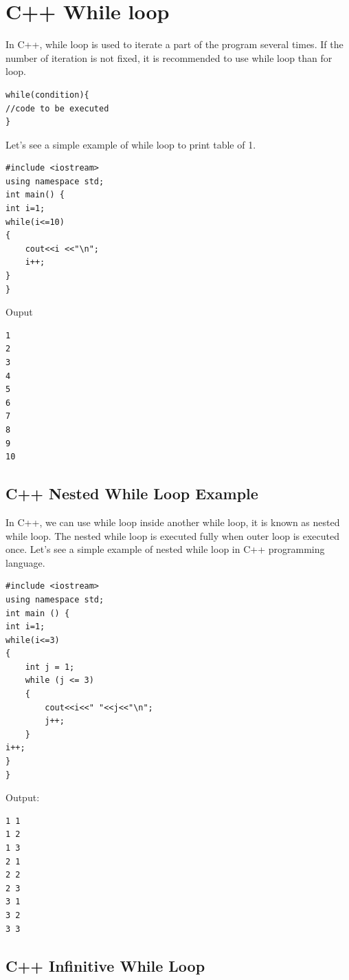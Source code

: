 \documentclass{book}
\begin{document}
\section{C++ While loop}

In C++, while loop is used to iterate a part of the program several times. If the number of iteration is not fixed, it is recommended to use while loop than for loop.

\begin{lstlisting}
while(condition){    
//code to be executed    
}    
\end{lstlisting}

Let's see a simple example of while loop to print table of 1.

\begin{lstlisting}
#include <iostream>  
using namespace std;  
int main() {         
int i=1;      
while(i<=10)   
{      
	cout<<i <<"\n";    
	i++;  
}       
}  
\end{lstlisting}

Ouput 

\begin{lstlisting}
1
2
3
4
5
6
7
8
9
10
\end{lstlisting}

\subsection{C++ Nested While Loop Example}

In C++, we can use while loop inside another while loop, it is known as nested while loop. The nested while loop is executed fully when outer loop is executed once. Let's see a simple example of nested while loop in C++ programming language.

\begin{lstlisting}
#include <iostream>  
using namespace std;  
int main () {  
int i=1;      
while(i<=3)     
{    
	int j = 1;    
	while (j <= 3)    
	{      
		cout<<i<<" "<<j<<"\n";      
		j++;  
	}     
i++;  
}  
}    
\end{lstlisting}

Output:

\begin{lstlisting}
1 1
1 2
1 3
2 1
2 2 
2 3
3 1
3 2
3 3
\end{lstlisting}

\subsection{C++ Infinitive While Loop}
\end{document}
